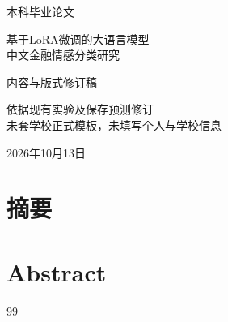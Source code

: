 \documentclass[12pt,a4paper,fontset=windows]{ctexart}
\numberwithin{figure}{section}
\numberwithin{table}{section}
\begin{document}
\begin{titlepage}
\centering
\vspace*{2cm}
{\heiti 本科毕业论文\par}
\vspace{2.4cm}
{\heiti 基于LoRA微调的大语言模型\\中文金融情感分类研究\par}
\vspace{2cm}
{ 内容与版式修订稿\par}
\vfill
{ 依据现有实验及保存预测修订\\未套学校正式模板，未填写个人与学校信息\par}
\vspace{1cm}
{ 2026年10月13日\par}
\end{titlepage}
\section*{摘要}

\clearpage
\section*{Abstract}
\begingroup{}\fontsize{11}{13.5}\selectfont\par\endgroup
\clearpage\begingroup{}\fontsize{10.5}{12.5}\selectfont\tableofcontents\endgroup
\clearpage{}





\clearpage
{}
\begingroup{}\fontsize{10.5}{13}\selectfont\renewcommand{\bibfont}{\fontsize{10.5}{13}\selectfont}\setlength{\bibsep}{5pt}\begin{thebibliography}{99}

\end{thebibliography}\endgroup
\end{document}
